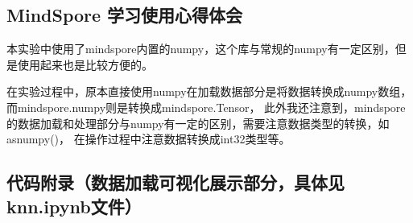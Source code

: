 \documentclass[12pt]{article}
\begin{document}
\subsection{MindSpore 学习使用心得体会}
本实验中使用了mindspore内置的numpy，这个库与常规的numpy有一定区别，但是使用起来也是比较方便的。

在实验过程中，原本直接使用numpy在加载数据部分是将数据转换成numpy数组，而mindspore.numpy则是转换成mindspore.Tensor，
此外我还注意到，mindspore的数据加载和处理部分与numpy有一定的区别，需要注意数据类型的转换，如asnumpy()，
在操作过程中注意数据转换成int32类型等。



\subsection{代码附录（数据加载可视化展示部分，具体见knn.ipynb文件）}
\end{document}
